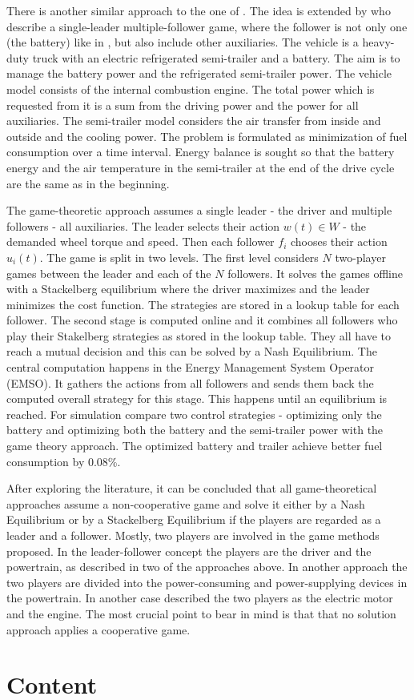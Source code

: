 
There is another similar approach to the one of \citet{dextreit2014game}. The idea is extended by \citet{chen2014game} who describe a single-leader multiple-follower game, where the follower is not only one (the battery) like in \citet{dextreit2014game}, but also include other auxiliaries. The vehicle is a heavy-duty truck with an electric refrigerated semi-trailer and a battery. The aim is to manage the battery power and the refrigerated semi-trailer power. The vehicle model consists of the internal combustion engine. The total power which is requested from it is a sum from the driving power and the power for all auxiliaries. The semi-trailer model considers the air transfer from inside and outside and the cooling power. The problem is formulated as minimization of fuel consumption over a time interval. Energy balance is sought so that the battery energy and the air temperature in the semi-trailer at the end of the drive cycle are the same as in the beginning.

The game-theoretic approach assumes a single leader - the driver and multiple followers - all auxiliaries. The leader selects their action $w(t) \in W$ - the demanded wheel torque and speed. Then each follower $f_i$ chooses their action $u_i(t)$. The game is split in two levels. The first level considers $N$ two-player games between the leader and each of the $N$ followers. It solves the games offline with a Stackelberg equilibrium where the driver maximizes and the leader minimizes the cost function. The strategies are stored in a lookup table for each follower. The second stage is computed online and it combines all followers who play their Stakelberg strategies as stored in the lookup table. They all have to reach a mutual decision and this can be solved by a Nash Equilibrium. The central computation happens in the Energy Management System Operator (EMSO). It gathers the actions from all followers and sends them back the computed overall strategy for this stage. This happens until an equilibrium is reached. For simulation \citet{chen2014game} compare two control strategies - optimizing only the battery and optimizing both the battery and the semi-trailer power with the game theory approach. The optimized battery and trailer achieve better fuel consumption by 0.08\%.


After exploring the literature, it can be concluded that all game-theoretical approaches assume a non-cooperative game and solve it either by a Nash Equilibrium or by a Stackelberg Equilibrium if the players are regarded as a leader and a follower. Mostly, two players are involved in the game methods proposed. In the leader-follower concept the players are the driver and the powertrain, as described in two of the approaches above. In another approach the two players are divided into the power-consuming and power-supplying devices in the powertrain. In another case \citet{chin2010design} described the two players as the electric motor and the engine. The most crucial point to bear in mind is that that no solution approach applies a cooperative game.

\section{Content}
